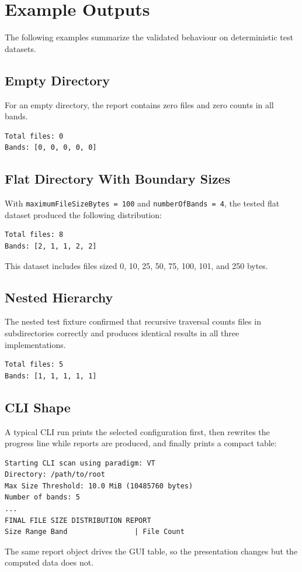 \clearpage
\section{Example Outputs}

The following examples summarize the validated behaviour on deterministic test
datasets.

\subsection{Empty Directory}

For an empty directory, the report contains zero files and zero counts in all
bands.

\begin{verbatim}
Total files: 0
Bands: [0, 0, 0, 0, 0]
\end{verbatim}

\subsection{Flat Directory With Boundary Sizes}

With \texttt{maximumFileSizeBytes = 100} and \texttt{numberOfBands = 4}, the
tested flat dataset produced the following distribution:

\begin{verbatim}
Total files: 8
Bands: [2, 1, 1, 2, 2]
\end{verbatim}

This dataset includes files sized 0, 10, 25, 50, 75, 100, 101, and 250 bytes.

\subsection{Nested Hierarchy}

The nested test fixture confirmed that recursive traversal counts files in
subdirectories correctly and produces identical results in all three
implementations.

\begin{verbatim}
Total files: 5
Bands: [1, 1, 1, 1, 1]
\end{verbatim}

\subsection{CLI Shape}

A typical CLI run prints the selected configuration first, then rewrites the
progress line while reports are produced, and finally prints a compact table:

\begin{verbatim}
Starting CLI scan using paradigm: VT
Directory: /path/to/root
Max Size Threshold: 10.0 MiB (10485760 bytes)
Number of bands: 5
...
FINAL FILE SIZE DISTRIBUTION REPORT
Size Range Band                | File Count
\end{verbatim}

The same report object drives the GUI table, so the presentation changes but
the computed data does not.
